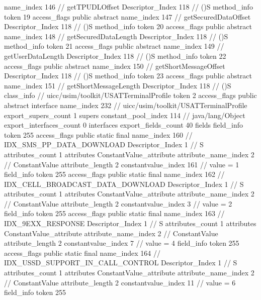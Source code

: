 {{{{{					name_index	146		// getTPUDLOffset
					Descriptor_Index	118		// ()S
				}
				method_info {
					token	19
					access_flags	public abstract
					name_index	147		// getSecuredDataOffset
					Descriptor_Index	118		// ()S
				}
				method_info {
					token	20
					access_flags	public abstract
					name_index	148		// getSecuredDataLength
					Descriptor_Index	118		// ()S
				}
				method_info {
					token	21
					access_flags	public abstract
					name_index	149		// getUserDataLength
					Descriptor_Index	118		// ()S
				}
				method_info {
					token	22
					access_flags	public abstract
					name_index	150		// getShortMessageOffset
					Descriptor_Index	118		// ()S
				}
				method_info {
					token	23
					access_flags	public abstract
					name_index	151		// getShortMessageLength
					Descriptor_Index	118		// ()S
				}
			}
		}
		class_info {		// uicc/usim/toolkit/USATTerminalProfile
			token	2
			access_flags	public abstract interface
			name_index	232		// uicc/usim/toolkit/USATTerminalProfile
			export_supers_count	1
			supers {
				constant_pool_index	114		// java/lang/Object
			}
			export_interfaces_count	0
			interfaces {
			}
			export_fields_count	40
			fields {
			field_info {
				token	255
				access_flags	public static final
				name_index	160		// IDX_SMS_PP_DATA_DOWNLOAD
				Descriptor_Index	1		// S
				attributes_count	1
				attributes {
				ConstantValue_attribute {
					attribute_name_index	2		// ConstantValue
					attribute_length	2
					constantvalue_index	161		// value = 1
				}
				}
			}
			field_info {
				token	255
				access_flags	public static final
				name_index	162		// IDX_CELL_BROADCAST_DATA_DOWNLOAD
				Descriptor_Index	1		// S
				attributes_count	1
				attributes {
				ConstantValue_attribute {
					attribute_name_index	2		// ConstantValue
					attribute_length	2
					constantvalue_index	3		// value = 2
				}
				}
			}
			field_info {
				token	255
				access_flags	public static final
				name_index	163		// IDX_9EXX_RESPONSE
				Descriptor_Index	1		// S
				attributes_count	1
				attributes {
				ConstantValue_attribute {
					attribute_name_index	2		// ConstantValue
					attribute_length	2
					constantvalue_index	7		// value = 4
				}
				}
			}
			field_info {
				token	255
				access_flags	public static final
				name_index	164		// IDX_USSD_SUPPORT_IN_CALL_CONTROL
				Descriptor_Index	1		// S
				attributes_count	1
				attributes {
				ConstantValue_attribute {
					attribute_name_index	2		// ConstantValue
					attribute_length	2
					constantvalue_index	11		// value = 6
				}
				}
			}
			field_info {
				token	255
}}}}}
